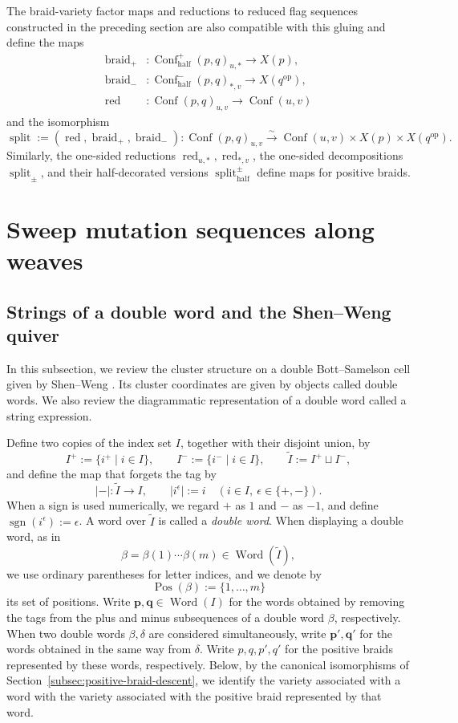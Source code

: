 \documentclass[10pt,a4paper]{article}
\theoremstyle{definition}
\theoremstyle{remark}
\newcommand{\Conf}{\operatorname{Conf}}
\newcommand{\Confhalf}{\operatorname{Conf}_{\mathrm{half}}}
\newcommand{\Split}{\operatorname{split}}
\newcommand{\Word}{\operatorname{Word}}
\begin{document}
The braid-variety factor maps and reductions to reduced flag sequences
constructed in the preceding section are also compatible with this gluing and
define the maps
\[
 \begin{aligned}
  \operatorname{braid}_+&:
  \Confhalf^+(p,q)_{u,*}\longrightarrow X(p),\\
  \operatorname{braid}_-&:
  \Confhalf^-(p,q)_{*,v}\longrightarrow X(q^{\mathrm{op}}),\\
  \operatorname{red}&:
  \Conf(p,q)_{u,v}\longrightarrow\Conf(u,v)
 \end{aligned}
\]
and the isomorphism
\[
 \Split
 :=(\operatorname{red},\operatorname{braid}_+,\operatorname{braid}_-):
 \Conf(p,q)_{u,v}
 \xrightarrow{\sim}
 \Conf(u,v)\times X(p)\times X(q^{\mathrm{op}}).
\]
Similarly, the one-sided reductions
\(\operatorname{red}_{u,*},\operatorname{red}_{*,v}\), the one-sided
decompositions \(\Split_\pm\), and their half-decorated versions
\(\Split_{\mathrm{half}}^\pm\) define maps for positive braids.

\section{Sweep mutation sequences along weaves}

\subsection{Strings of a double word and the Shen--Weng quiver}
\label{subsec:double-word-data}

In this subsection, we review the cluster structure on a double
Bott--Samelson cell given by Shen--Weng \cite{ShenWeng2021}.  Its cluster
coordinates are given by objects called double words.  We also review the
diagrammatic representation of a double word called a string expression.

Define two copies of the index set \(I\), together with their disjoint union,
by
\[
 I^+:=\{i^+\mid i\in I\},\qquad
 I^-:=\{i^-\mid i\in I\},\qquad
 \widetilde I:=I^+\sqcup I^-,
\]
and define the map that forgets the tag by
\[
 |-|:\widetilde I\longrightarrow I,
 \qquad |i^\epsilon|:=i
 \quad(i\in I,\ \epsilon\in\{+,-\}).
\]
When a sign is used numerically, we regard \(+\) as \(1\) and \(-\) as
\(-1\), and define \(\operatorname{sgn}(i^\epsilon):=\epsilon\).  A word over
\(\widetilde I\) is called a \emph{double word}.  When displaying a double
word, as in
\[
 \beta=\beta(1)\cdots\beta(m)\in\Word(\widetilde I),
\]
we use ordinary parentheses for letter indices, and we denote by
\[
 \operatorname{Pos}(\beta):=\{1,\ldots,m\}
\]
its set of positions.
Write \(\mathbf p,\mathbf q\in\Word(I)\) for the words obtained by removing
the tags from the plus and minus subsequences of a double word \(\beta\),
respectively.  When two double words \(\beta,\delta\) are considered
simultaneously, write \(\mathbf p',\mathbf q'\) for the words obtained in the
same way from \(\delta\).  Write \(p,q,p',q'\) for the positive braids
represented by these words, respectively.  Below, by the canonical
isomorphisms of Section~\ref{subsec:positive-braid-descent}, we identify the
variety associated with a word with the variety associated with the positive
braid represented by that word.
\end{document}
